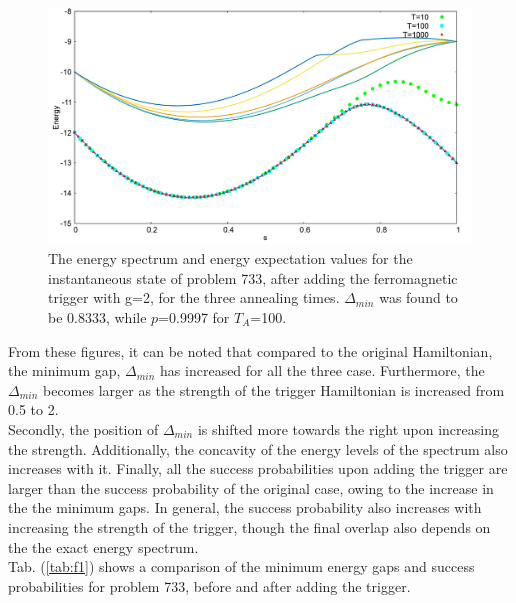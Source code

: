 \documentclass[../main.tex]{subfiles}
\begin{document}
\begin{figure}[H]
\centering 
\includegraphics[scale=0.24]{733_s12_F_g2.png}
\caption{The energy spectrum and energy expectation values for the instantaneous state of problem 733, after adding the ferromagnetic trigger with g=2, for the three annealing times. $\Delta_{min}$ was found to be 0.8333, while $p$=0.9997 for $T_A$=100.}
\label{fig:f3}
\end{figure}
From these figures, it can be noted that compared to the original Hamiltonian, the minimum gap, $\Delta_{min}$ has increased for all the three case. Furthermore, the $\Delta_{min}$ becomes larger as the strength of the trigger Hamiltonian is increased from 0.5 to 2. \\
Secondly, the position of $\Delta_{min}$ is shifted more towards the right upon increasing the strength. Additionally, the concavity of the energy levels of the spectrum also increases with it. 
Finally, all the success probabilities upon adding the trigger are larger than the success probability of the original case, owing to the increase in the the minimum gaps. In general, the success probability also increases with increasing the strength of the trigger, though the final overlap also depends on the the exact energy spectrum. \\
Tab. (\ref{tab:f1}) shows a comparison of the minimum energy gaps and success probabilities for problem 733, before and after adding the trigger. 
\end{document}
